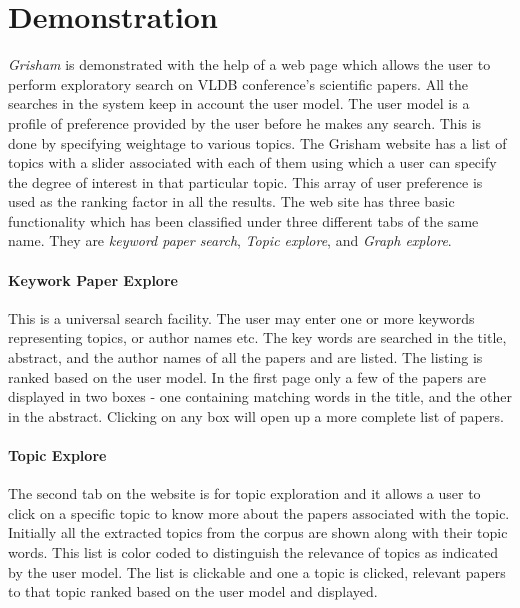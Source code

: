 \section{Demonstration}

\emph{Grisham} is demonstrated with the help of a web page which allows the user to perform exploratory search on VLDB conference's scientific papers. All the searches in the system keep in account the user model. The user model is a profile of preference provided by the user before he makes any search. This is done by specifying weightage to various topics. The Grisham website has a list of topics with a slider associated with each of them using which a user can specify the degree of interest in that particular topic. This array of user preference is used as the ranking factor in all the results. The web site has three basic functionality which has been classified under three different tabs of the same name. They are \emph{keyword paper search}, \emph{Topic explore}, and \emph{Graph explore}. 

\paragraph{Keywork Paper Explore} This is a universal search facility. The user may enter one or more keywords representing topics, or author names etc. The key words are searched in the title, abstract, and the author names of all the papers and are listed. The listing is ranked based on the user model. In the first page only a few of the papers are displayed  in two boxes - one containing matching words in the title, and the other in the abstract. Clicking on any box will open up a more complete list of papers.

\paragraph{Topic Explore} The second tab on the website is for topic exploration and it allows a user to click on a specific topic to know more about the papers associated with the topic. Initially all the extracted topics from the corpus are shown along with their topic words. This list is color coded to distinguish the relevance of topics as indicated by the user model. The list is clickable and one a topic is clicked, relevant papers to that topic ranked based on the user model and displayed.

